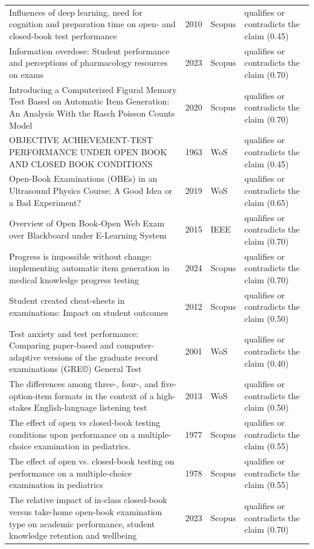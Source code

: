 \begin{longtable}{@{}%
  >{\raggedright\arraybackslash}p{}c%
  >{\raggedright\arraybackslash}p{}%
  >{\raggedright\arraybackslash}p{}@{}}
Influences of deep learning, need for cognition and preparation time on open- and closed-book test performance & 2010 & Scopus & qualifies or contradicts the claim (0.45) \\
Information overdose: Student performance and perceptions of pharmacology resources on exams & 2023 & Scopus & qualifies or contradicts the claim (0.70) \\
Introducing a Computerized Figural Memory Test Based on Automatic Item Generation: An Analysis With the Rasch Poisson Counts Model & 2020 & Scopus & qualifies or contradicts the claim (0.70) \\
OBJECTIVE ACHIEVEMENT-TEST PERFORMANCE UNDER OPEN BOOK AND CLOSED BOOK CONDITIONS & 1963 & WoS & qualifies or contradicts the claim (0.45) \\
Open-Book Examinations (OBEs) in an Ultrasound Physics Course: A Good Idea or a Bad Experiment? & 2019 & WoS & qualifies or contradicts the claim (0.65) \\
Overview of Open Book-Open Web Exam over Blackboard under E-Learning System & 2015 & IEEE & qualifies or contradicts the claim (0.70) \\
Progress is impossible without change: implementing automatic item generation in medical knowledge progress testing & 2024 & Scopus & qualifies or contradicts the claim (0.70) \\
Student created cheat-sheets in examinations: Impact on student outcomes & 2012 & Scopus & qualifies or contradicts the claim (0.50) \\
Test anxiety and test performance: Comparing paper-based and computer-adaptive versions of the graduate record examinations (GRE©) General Test & 2001 & WoS & qualifies or contradicts the claim (0.40) \\
The differences among three-, four-, and five-option-item formats in the context of a high-stakes English-language listening test & 2013 & WoS & qualifies or contradicts the claim (0.50) \\
The effect of open vs closed-book testing conditions upon performance on a multiple-choice examination in pediatrics. & 1977 & Scopus & qualifies or contradicts the claim (0.55) \\
The effect of open vs. closed-book testing on performance on a multiple-choice examination in pediatrics & 1978 & Scopus & qualifies or contradicts the claim (0.55) \\
The relative impact of in-class closed-book versus take-home open-book examination type on academic performance, student knowledge retention and wellbeing & 2023 & Scopus & qualifies or contradicts the claim (0.70) \\

\end{longtable}

